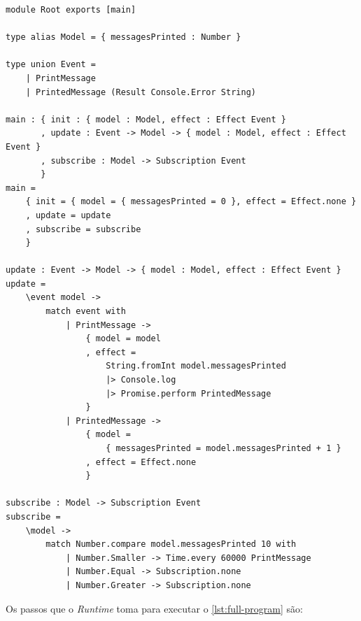\begin{lstlisting}[label={lst:full-program},caption={Exemplo de programa completo em Ipe, que imprime na tela uma mensagem a cada minuto}]
module Root exports [main]

type alias Model = { messagesPrinted : Number }

type union Event = 
    | PrintMessage
    | PrintedMessage (Result Console.Error String)

main : { init : { model : Model, effect : Effect Event }
       , update : Event -> Model -> { model : Model, effect : Effect Event }
       , subscribe : Model -> Subscription Event
       }
main =
    { init = { model = { messagesPrinted = 0 }, effect = Effect.none }
    , update = update
    , subscribe = subscribe
    }

update : Event -> Model -> { model : Model, effect : Effect Event }
update =
    \event model ->
        match event with
            | PrintMessage ->
                { model = model
                , effect = 
                    String.fromInt model.messagesPrinted
                    |> Console.log
                    |> Promise.perform PrintedMessage
                }
            | PrintedMessage ->
                { model =
                    { messagesPrinted = model.messagesPrinted + 1 }
                , effect = Effect.none
                }

subscribe : Model -> Subscription Event
subscribe =
    \model ->
        match Number.compare model.messagesPrinted 10 with
            | Number.Smaller -> Time.every 60000 PrintMessage
            | Number.Equal -> Subscription.none
            | Number.Greater -> Subscription.none
\end{lstlisting}

Os passos que o \textit{Runtime} toma para executar o \autoref{lst:full-program}
são:

